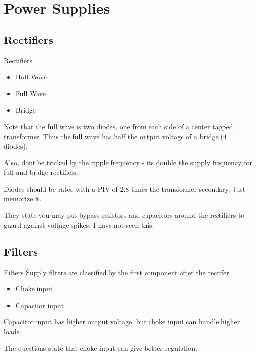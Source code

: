 \documentclass{beamer}
\begin{document}
\section{Power Supplies}

\subsection{Rectifiers}
\begin{frame}{Rectifiers}{}
\begin{itemize}
\item Half Wave
\item Full Wave
\item Bridge
\end{itemize}
Note that the full wave is two diodes, one from each side of a center tapped transformer.  Thus the full wave has 
half the output voltage of a bridge (4 diodes).

Also, dont be tricked by the ripple frequency - its double the supply frequency for full and bridge rectifiers.

Diodes should be rated with a PIV of 2.8 times the transformer secondary.  Just memorize it.

They state you may put bypass resistors and capacitors around the rectifiers to guard against voltage spikes.  I have not seen this.
\end{frame}

\subsection{Filters}
\begin{frame}{Filters}{}
Supply filters are classified by the first component after the rectifer. 
\begin{itemize}
\item Choke input
\item Capacitor input 
\end{itemize}

Capacitor input has higher output voltage, but choke input can handle higher loads.

The questions state that choke input can give better regulation.

\end{frame}
\end{document}
